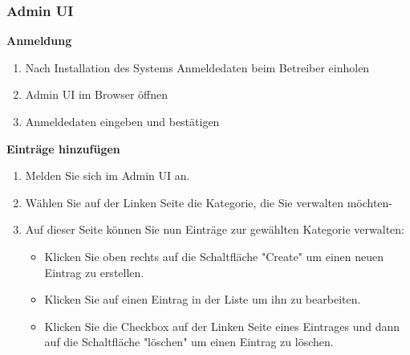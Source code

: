 \subsubsection*{Admin UI}

\textbf{Anmeldung}

\begin{enumerate}
    \item Nach Installation des Systems Anmeldedaten beim Betreiber einholen
    \item Admin UI im Browser öffnen
    \item Anmeldedaten eingeben und bestätigen
\end{enumerate}

\textbf{Einträge hinzufügen}
\begin{enumerate}
    \item Melden Sie sich im Admin UI an.
    \item Wählen Sie auf der Linken Seite die Kategorie, die Sie verwalten möchten-
    \item Auf dieser Seite können Sie nun Einträge zur gewählten Kategorie verwalten:
    \begin{itemize}
        \item Klicken Sie oben rechts auf die Schaltfläche "Create" um einen neuen Eintrag zu erstellen.
        \item Klicken Sie auf einen Eintrag in der Liste um ihn zu bearbeiten.
        \item Klicken Sie die Checkbox auf der Linken Seite eines Eintrages und dann auf die Schaltfläche "löschen" um einen Eintrag zu löschen.
    \end{itemize}
\end{enumerate}

